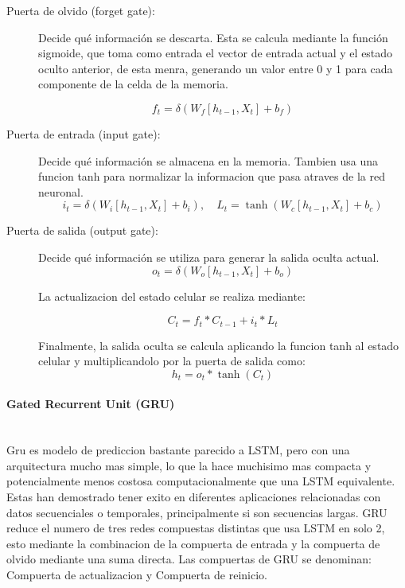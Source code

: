     \begin{description}
        \item[Puerta de olvido (forget gate):] Decide qué información se descarta. Esta se calcula mediante la función sigmoide, que toma como entrada el vector de entrada actual y el estado oculto anterior, de esta menra, generando un valor entre 0 y 1 para cada componente de la celda de la memoria. 
        
        \begin{equation}
        f_t = \delta(W_f[h_{t-1}, X_t] + b_f)
        \end{equation}   

        \item[Puerta de entrada (input gate):] Decide qué información se almacena en la memoria. Tambien usa una funcion tanh para normalizar la informacion que pasa atraves de la red neuronal.
        \begin{equation}
        i_t = \delta(W_i[h_{t-1}, X_t] + b_i), \quad L_t = \tanh(W_c[h_{t-1}, X_t] + b_c)
        \end{equation}

        \item[Puerta de salida (output gate):] Decide qué información se utiliza para generar la salida oculta actual.
        \begin{equation}
        o_t = \delta(W_o[h_{t-1}, X_t] + b_o)
        \end{equation}

        La actualizacion del estado celular se realiza mediante:

        \begin{equation}
        C_t = f_t * C_{t-1} + i_t * L_t
        \end{equation}

        Finalmente, la salida oculta se calcula aplicando la funcion tanh al estado celular y multiplicandolo por la puerta de salida como:
        \begin{equation}
        h_t = o_t * \tanh(C_t)
        \end{equation}
    \end{description}


    \paragraph{Gated Recurrent Unit (GRU)}\mbox{}\\
    Gru es modelo de prediccion bastante parecido a LSTM, pero con una arquitectura mucho mas simple, lo que la hace muchisimo mas compacta y potencialmente menos costosa computacionalmente que una LSTM equivalente. Estas han demostrado tener exito en diferentes aplicaciones relacionadas con datos secuenciales o temporales, principalmente si son secuencias largas. GRU reduce el numero de tres redes compuestas distintas que usa LSTM en solo 2, esto mediante la combinacion de la compuerta de entrada y la compuerta de olvido mediante una suma directa. Las compuertas de GRU se denominan: Compuerta de actualizacion y Compuerta de reinicio. \cite{Salem2022}

